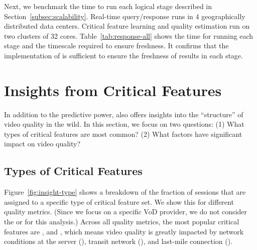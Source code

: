 Next, we benchmark the time to run each logical stage 
described in Section~\ref{subsec:scalability}.
Real-time query/response runs in 4 geographically 
distributed data centers.
Critical feature learning and quality estimation run 
on two clusters of 32 cores. 
Table~\ref{tab:response-all} shows the time for 
running each stage and the timescale required to 
ensure freshness. 
It confirms that the implementation of \dda is sufficient 
to ensure the freshness of results in each stage.



\section{Insights from Critical Features}
\label{sec:cfa:insight}

In addition to the predictive power, \dda also offers 
 insights into the ``structure'' of video quality in the wild. 
In this section, we  focus on two questions:
(1) What types of critical features are most common?
(2) What factors have significant impact on video quality?

\subsection{Types of Critical Features} 
\label{subsec:insight-type}


Figure~\ref{fig:insight-type} shows a breakdown of the 
fraction of sessions that are assigned to a specific 
type of critical feature set. We show this for  different 
quality metrics. 
(Since we focus on a specific VoD provider, we do 
not consider the \fSite or \fLiveOrVoD for this analysis.)
Across all quality metrics, the most popular critical 
features are \fCDN, \fASN and \fConnectionType, which 
means video quality is greatly impacted by network 
conditions at the server (\fCDN), transit network (\fASN),
and last-mile connection (\fConnectionType).  

